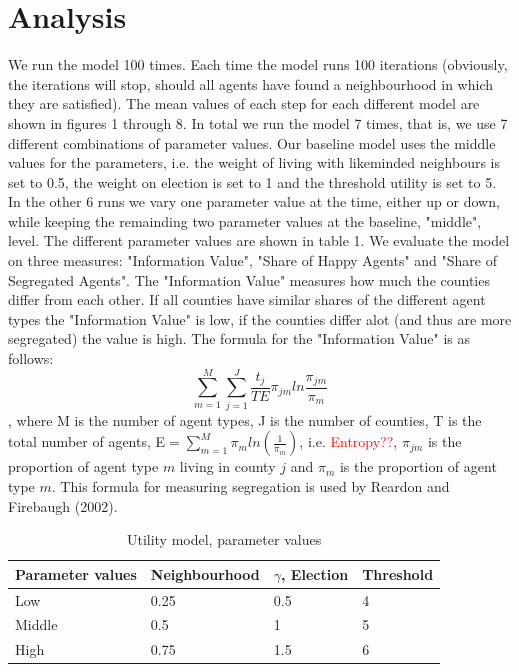 \documentclass[12pt, a4paper]{article}
\begin{document}
\section{\label{sec_res}Analysis}
We run the model 100 times. Each time the model runs 100 iterations (obviously, the iterations will stop, should all agents have found a neighbourhood in which they are satisfied). The mean values of each step for each different model are shown in figures 1 through 8. In total we run the model 7 times, that is, we use 7 different combinations of parameter values. Our baseline model uses the middle values for the parameters, i.e. the weight of living with likeminded neighbours is set to 0.5, the weight on election is set to 1 and the threshold utility is set to 5. In the other 6 runs we vary one parameter value at the time, either up or down, while keeping the remainding two parameter values at the baseline, "middle", level. The different parameter values are shown in table 1. We evaluate the model on three measures: "Information Value", "Share of Happy Agents" and "Share of Segregated Agents". The "Information Value" measures how much the counties differ from each other. If all counties have similar shares of the different agent types the "Information Value" is low, if the counties differ alot (and thus are more segregated) the value is high. The formula for the "Information Value" is as follows: \newline \newline
$$\sum_{m=1}^{M}\sum_{j=1}^{J}\frac{t_j}{TE}\pi_{jm}ln\frac{\pi_{jm}}{\pi_m}$$, where M is the number of agent types, J is the number of counties, T is the total number of agents, E$=\sum_{m=1}^{M}\pi_m ln(\frac{1}{\pi_m})$, i.e. \textcolor{red}{Entropy??}, $\pi_{jm}$ is the proportion of agent type $m$ living in county $j$ and $\pi_m$ is the proportion of agent type $m$. This formula for measuring segregation is used by Reardon and Firebaugh (2002). 

\begin{table}[ht]
	\centering
	\caption{Utility model, parameter values}
	\begin{tabular}{llll}
		\hline
		Parameter values & Neighbourhood & $\gamma$, Election & Threshold \\ 
		\hline \hline
		Low & 0.25 & 0.5 & 4 \\ 
		Middle & 0.5 & 1 & 5 \\ 
		High & 0.75 & 1.5 & 6 \\ \hline
		\hline
	\end{tabular}
\end{table}
\end{document}

